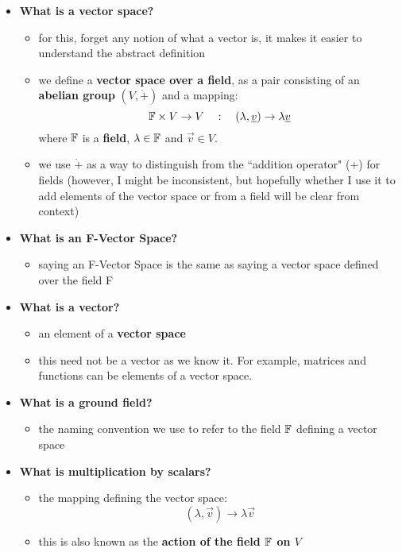 \documentclass{exam}
\begin{document}
\begin{itemize}
    \item \textbf{What is a vector space?}
    \begin{itemize}
        \item for this, forget any notion of what a vector is, it makes it easier to understand the abstract definition
        \item we define a \textbf{vector space over a field}, as a pair consisting of an \textbf{abelian group} $(V,\dot{+})$ and a mapping:
        \[
        \mathbb{F} \times V \to V \quad : \quad (\lambda, \underline{v})\to \lambda \underline{v}
        \]
        where $\mathbb{F}$ is a \textbf{field}, $\lambda \in \mathbb{F}$ and $\vec{v} \in V$.
        \item we use $\dot{+}$ as a way to distinguish from the ``addition operator" (+) for fields (however, I might be inconsistent, but hopefully whether I use it to add elements of the vector space or from a field will be clear from context)
    \end{itemize}
    \item \textbf{What is an F-Vector Space?}
    \begin{itemize}
        \item saying an F-Vector Space is the same as saying a vector space defined over the field F
    \end{itemize}
    \item \textbf{What is a vector?}
    \begin{itemize}
        \item an element of a \textbf{vector space}
        \item this need not be a vector as we know it. For example, matrices and functions can be elements of a vector space.
    \end{itemize}
    \item \textbf{What is a ground field?}
    \begin{itemize}
        \item the naming convention we use to refer to the field $\mathbb{F}$ defining a vector space
    \end{itemize}
    \item \textbf{What is multiplication by scalars?}
    \begin{itemize}
        \item the mapping defining the vector space:
        \[
        (\lambda, \vec{v})\to \lambda \vec{v}
        \]
        \item this is also known as the \textbf{action of the field $\mathbb{F}$ on $V$}

\end{itemize}
\end{itemize}
\end{document}
